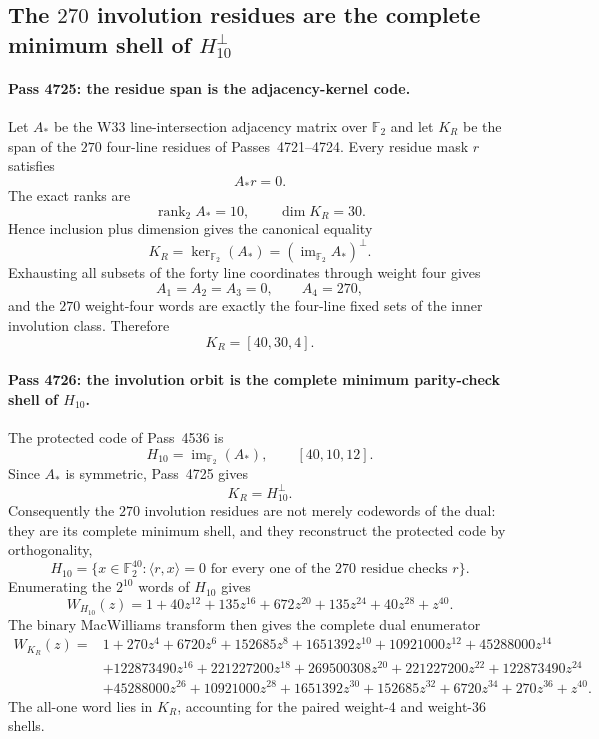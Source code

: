 \subsection*{The $270$ involution residues are the complete minimum shell of $H_{10}^{\perp}$}

\paragraph{Pass 4725: the residue span is the adjacency-kernel code.}
Let $A_*$ be the W33 line-intersection adjacency matrix over $\mathbb F_2$ and
let $K_R$ be the span of the $270$ four-line residues of Passes~4721--4724.
Every residue mask $r$ satisfies
\[
 A_*r=0.
\]
The exact ranks are
\[
 \operatorname{rank}_{2}A_*=10,
 \qquad
 \dim K_R=30.
\]
Hence inclusion plus dimension gives the canonical equality
\[
 \boxed{K_R=\ker_{\mathbb F_2}(A_*)=(\operatorname{im}_{\mathbb F_2}A_*)^\perp.}
\]
Exhausting all subsets of the forty line coordinates through weight four gives
\[
 A_1=A_2=A_3=0,
 \qquad
 \boxed{A_4=270},
\]
and the $270$ weight-four words are exactly the four-line fixed sets of the
inner involution class.  Therefore
\[
 \boxed{K_R=[40,30,4].}
\]

\paragraph{Pass 4726: the involution orbit is the complete minimum parity-check shell of $H_{10}$.}
The protected code of Pass~4536 is
\[
 H_{10}=\operatorname{im}_{\mathbb F_2}(A_*),
 \qquad [40,10,12].
\]
Since $A_*$ is symmetric, Pass~4725 gives
\[
 \boxed{K_R=H_{10}^{\perp}.}
\]
Consequently the $270$ involution residues are not merely codewords of the dual:
they are its complete minimum shell, and they reconstruct the protected code by
orthogonality,
\[
 \boxed{
 H_{10}=
 \{x\in\mathbb F_2^{40}:\langle r,x\rangle=0
   \text{ for every one of the }270\text{ residue checks }r\}.
 }
\]
Enumerating the $2^{10}$ words of $H_{10}$ gives
\[
 W_{H_{10}}(z)=1+40z^{12}+135z^{16}+672z^{20}
 +135z^{24}+40z^{28}+z^{40}.
\]
The binary MacWilliams transform then gives the complete dual enumerator
\[
\begin{aligned}
W_{K_R}(z)={}&1+270z^4+6720z^6+152685z^8+1651392z^{10}
+10921000z^{12}+45288000z^{14}\\
&+122873490z^{16}+221227200z^{18}+269500308z^{20}
+221227200z^{22}+122873490z^{24}\\
&+45288000z^{26}+10921000z^{28}+1651392z^{30}
+152685z^{32}+6720z^{34}+270z^{36}+z^{40}.
\end{aligned}
\]
The all-one word lies in $K_R$, accounting for the paired weight-$4$ and
weight-$36$ shells.

